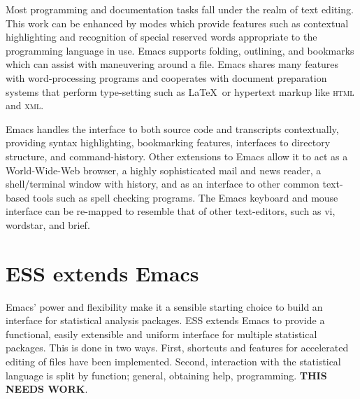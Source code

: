 \documentclass{article}
\begin{document}
Most programming and documentation tasks fall under the realm of text
editing.  This work can be enhanced by modes which provide features such
as contextual highlighting and recognition of special reserved words
appropriate to the programming language in use.  Emacs supports
folding, outlining, and bookmarks which can assist with maneuvering
around a file.  Emacs shares many features with word-processing
programs and cooperates with document preparation systems
that perform type-setting such as \LaTeX\ or hypertext markup
like \textsc{html} and \textsc{xml}.


 Emacs handles the
interface to both source code and transcripts contextually, providing
syntax highlighting, bookmarking features, interfaces to directory
structure, and command-history.  Other extensions to Emacs allow it to
act as a World-Wide-Web browser, a highly sophisticated mail and news
reader, a shell/terminal window with history, and as an interface to
other common text-based tools such as spell checking programs.  The
Emacs keyboard and mouse interface can be re-mapped to resemble that
of other text-editors, such as vi, wordstar, and brief.


\section{ESS extends Emacs}
\label{sec:ess-extends-emacs}

Emacs' power and flexibility make it a sensible starting choice to
build an interface for statistical analysis packages.  ESS extends
Emacs to provide a functional, easily extensible and uniform interface
for multiple statistical packages.  This is done in two ways.  First,
shortcuts and features for accelerated editing of files have been
implemented.  Second, interaction with the statistical
language is split by function; general, obtaining help, programming.
\textbf{THIS NEEDS WORK}.

\end{document}
